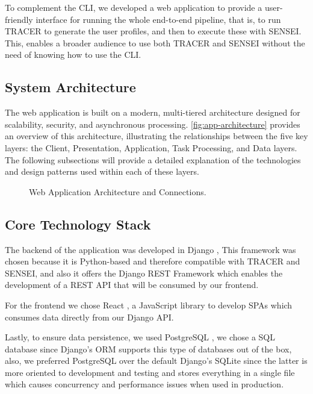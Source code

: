 To complement the \ac{CLI},
we developed a web application
to provide a user-friendly interface for running the whole end-to-end pipeline,
that is, to run \ac{TRACER} to generate the user profiles,
and then to execute these with SENSEI.
This, enables a broader audience to use both \ac{TRACER} and SENSEI
without the need of knowing how to use the \ac{CLI}.

\subsection{System Architecture}

The web application is built on a modern,
multi-tiered architecture designed for scalability, security, and asynchronous processing.
\autoref{fig:app-architecture} provides an overview of this architecture,
illustrating the relationships between the five key layers:
the Client, Presentation, Application, Task Processing, and Data layers.
The following subsections will provide a detailed explanation
of the technologies and design patterns used within each of these layers.

\begin{figure}[!htbp]
    \centering
    
    \caption{Web Application Architecture and Connections.}
    \label{fig:app-architecture}
\end{figure}

\subsection{Core Technology Stack}

The backend of the application was developed in Django \autocite{Django},
This framework was chosen because it is Python-based
and therefore compatible with \ac{TRACER} and SENSEI,
and also it offers the Django REST Framework \autocite{DjangoRESTFramework}
which enables the development of a \ac{REST} \ac{API}
that will be consumed by our frontend.

For the frontend we chose React \autocite{React},
a JavaScript library to develop \acp{SPA}
which consumes data directly from our Django \ac{API}.

Lastly, to ensure data persistence,
we used PostgreSQL \autocite{PostgreSQL2025},
we chose a \ac{SQL} database since Django's \ac{ORM} supports this type of databases out of the box,
also, we preferred PostgreSQL over the default Django's SQLite
since the latter is more oriented to development and testing
and stores everything in a single file which causes concurrency and performance issues when used in production.

